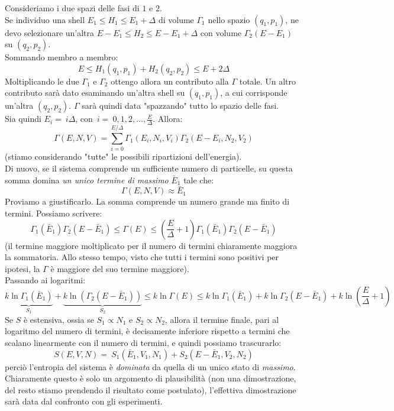 \documentclass[12pt]{article}
\begin{document}
Consideriamo i due spazi delle fasi di $1$ e $2$.\\
Se individuo una shell $E_1\leq H_1 \leq E_1+\Delta$ di volume $\Gamma_1$ nello spazio $(q_1, p_1)$, ne devo selezionare un'altra $E-E_1 \leq H_2 \leq E-E_1 +\Delta$ con volume $\Gamma_2(E-E_1)$ su $(q_2, p_2)$.\\
Sommando membro a membro:
\[
E \leq H_1(q_1, p_1) + H_2(q_2, p_2) \leq E+2\Delta
\]
Moltiplicando le due $\Gamma_1$ e $\Gamma_2$ ottengo allora un contributo alla $\Gamma$ totale. Un altro contributo sarà dato esaminando un'altra shell su $(q_1, p_1)$, a cui corrisponde un'altra $(q_2, p_2)$. $\Gamma$ sarà quindi data "spazzando" tutto lo spazio delle fasi.\\
Sia quindi $E_i =\ i\Delta$, con\ $i =\ 0,1,2,\dots, \frac{E}{\Delta}$. Allora:
\[
\Gamma(E,N,V) =\sum_{i=0}^{E/\Delta} \Gamma_1(E_i, N_i,V_i) \Gamma_2(E-E_i, N_2, V_2)
\]
(stiamo considerando "tutte" le possibili ripartizioni dell'energia).\\
Di nuovo, se il sistema comprende un sufficiente numero di particelle, su questa somma domina \textit{un unico termine di massimo} $\bar{E}_1$ tale che:
\[
\Gamma(E,N,V) \approx \bar{E}_1
\]
Proviamo a giustificarlo. La somma comprende un numero grande ma finito di termini. Possiamo scrivere:
\[
\Gamma_1(\bar{E}_1)\Gamma_2(E-\bar{E}_1) \leq \Gamma(E) \leq \left (\frac{E}{\Delta}+1\right ) \Gamma_1(\bar{E}_1)\Gamma_2(E-\bar{E}_1)
\]
(il termine maggiore moltiplicato per il numero di termini chiaramente maggiora la sommatoria. Allo stesso tempo, visto che tutti i termini sono positivi per ipotesi, la $\Gamma$ è maggiore del suo termine maggiore).\\
Passando ai logaritmi:
\[
\underbrace{k\ln \Gamma_1(\bar{E}_1)}_{S_1} + \underbrace{k\ln(\Gamma_2(E-\bar{E}_1))}_{S_2} \leq k\ln\Gamma(E) \leq k\ln\Gamma_1(\bar{E}_1) + k\ln\Gamma_2(E-\bar{E}_1) + k\ln \left (\frac{E}{\Delta} +1 \right )
\]
Se $S$ è estensiva, ossia se $S_1 \propto N_1$ e $S_2 \propto N_2$, allora il termine finale, pari al logaritmo del numero di termini, è decisamente inferiore rispetto a termini che scalano linearmente con il numero di termini, e quindi possiamo trascurarlo:
\[
S(E,V,N) =\ S_1(\bar{E}_1,V_1,N_1) + S_2(E-\bar{E}_1, V_2, N_2)
\]
perciò l'entropia del sistema è \textit{dominata} da quella di un unico stato di \textit{massimo}.\\
Chiaramente questo è solo un argomento di plausibilità (non una dimostrazione, del resto stiamo prendendo il risultato come postulato), l'effettiva dimostrazione sarà data dal confronto con gli esperimenti.

\end{document}
